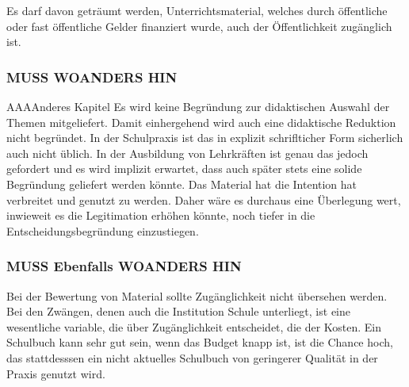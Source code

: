 Es darf davon geträumt werden, Unterrichtsmaterial, welches durch öffentliche oder fast öffentliche Gelder finanziert wurde, auch der Öffentlichkeit zugänglich ist.



\subsubsection{MUSS WOANDERS HIN}
AAAAnderes Kapitel
Es wird keine Begründung zur didaktischen Auswahl der Themen mitgeliefert. Damit einhergehend wird auch eine didaktische Reduktion nicht begründet. In der Schulpraxis ist das in explizit schriflticher Form sicherlich auch nicht üblich. In der Ausbildung von Lehrkräften ist genau das jedoch gefordert und es wird implizit erwartet, dass auch später stets eine solide Begründung geliefert werden könnte.
Das Material hat die Intention hat verbreitet und genutzt zu werden. Daher wäre es durchaus eine Überlegung wert, inwieweit es die Legitimation  erhöhen könnte, noch tiefer in die Entscheidungsbegründung einzustiegen.

\subsubsection{MUSS Ebenfalls WOANDERS HIN}
Bei der Bewertung von Material sollte Zugänglichkeit nicht übersehen werden. Bei den Zwängen, denen auch die Institution Schule unterliegt, ist eine wesentliche variable, die über Zugänglichkeit entscheidet, die der Kosten. 
Ein Schulbuch kann sehr gut sein, wenn das Budget knapp ist, ist die Chance hoch, das stattdesssen ein nicht aktuelles Schulbuch von geringerer Qualität in der Praxis genutzt wird. 


